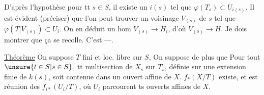 D'après l'hypothèse  pour tt $s\in S$, il existe un $i(s)$ tel que $\varphi(T_s)\subset U_{i(s)}$. Il est évident (préciser) que l'on peut trouver un voisinage $V_{(s)}$ de $s$ tel que $\varphi(T\vert V_{(s)})\subset U_i$. On en déduit un hom $V_{(s)}\longrightarrow H_i$, d'où $V_{(s)}\longrightarrow H$.
Je dois montrer que ça se recolle. C'est  ---.

\uline{Théorème} On suppose $T$ fini et loc. libre sur $S$,
On suppose de plus que  
Pour tout $\unsure{t\in S|s\in S}$, tt multisection de $X_s$ sur $T_s$, définie sur une extension finie de $k(s)$, soit contenue dans un ouvert affine de $X$.
\deleted{[\unsure{condition Hyp.}}  
$f_*(X/T)$ existe, et est réunion des $f_{i*}(U_i/T)$, où $U_i$ parcourent ts ouverts affines de $X$.
